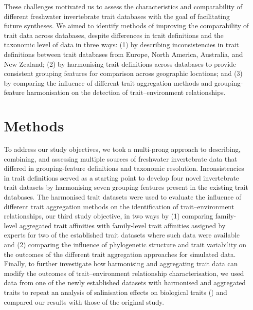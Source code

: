 \documentclass[12pt]{article}
\begin{document}
These challenges motivated us to assess the characteristics and comparability of different freshwater invertebrate trait databases with the goal of facilitating future syntheses. We aimed to identify methods of improving the comparability of trait data across databases, despite differences in trait definitions and the taxonomic level of data in three ways: (1) by describing inconsistencies in trait definitions between trait databases from Europe, North America, Australia, and New Zealand; (2) by harmonising trait definitions across databases to provide consistent grouping features for comparison across geographic locations; and (3) by comparing the influence of different trait aggregation methods and grouping-feature harmonisation on the detection of trait–environment relationships.


\section*{Methods}

To address our study objectives, we took a multi-prong approach to describing, combining, and assessing multiple sources of freshwater invertebrate data that differed in grouping-feature definitions and taxonomic resolution. Inconsistencies in trait definitions served as a starting point to develop four novel invertebrate trait datasets by harmonising seven grouping features present in the existing trait databases. The harmonised trait datasets were used to evaluate the influence of different trait aggregation methods on the identification of trait–environment relationships, our third study objective, in two ways by (1) comparing family-level aggregated trait affinities with family-level trait affinities assigned by experts for two of the established trait datasets where such data were available and (2) comparing the influence of phylogenetic structure and trait variability on the outcomes of the different trait aggregation approaches for simulated data. Finally, to further investigate how harmonising and aggregating trait data can modify the outcomes of trait–environment relationship characterisation, we used data from one of the newly established datasets with harmonised and aggregated traits to repeat an analysis of salinisation effects on biological traits (\cite{szocs_effects_2014}) and compared our results with those of the original study.
\end{document}
